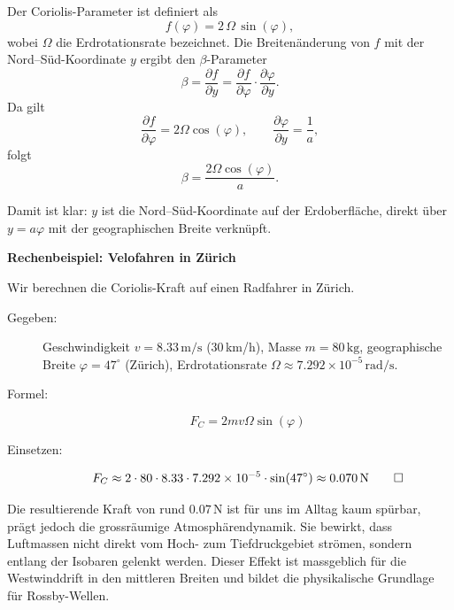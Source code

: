 Der Coriolis-Parameter ist definiert als
\begin{equation}
	f(\varphi) = 2 \, \Omega \, \sin(\varphi),
\end{equation}
wobei \(\Omega\) die Erdrotationsrate bezeichnet.
Die Breitenänderung von \(f\) mit der Nord–Süd-Koordinate \(y\) ergibt den \(\beta\)-Parameter
\begin{equation}
	\beta = \frac{\partial f}{\partial y}
	= \frac{\partial f}{\partial \varphi} \cdot \frac{\partial \varphi}{\partial y}.
\end{equation}
Da gilt
\begin{equation}
	\frac{\partial f}{\partial \varphi} = 2 \Omega \cos(\varphi),
	\qquad
	\frac{\partial \varphi}{\partial y} = \frac{1}{a},
\end{equation}
folgt
\begin{equation}
	\beta = \frac{2 \Omega \cos(\varphi)}{a}.
\end{equation}

Damit ist klar: \(y\) ist die Nord–Süd-Koordinate auf der Erdoberfläche, direkt
über \(y = a \varphi\) mit der geographischen Breite verknüpft.

\begin{beispiel}\textbf{Rechenbeispiel: Velofahren in Zürich}

\noindent
Wir berechnen die Coriolis-Kraft auf einen Radfahrer in Zürich.

\begin{description}
\item[Gegeben:] Geschwindigkeit \(v = 8.33\,\mathrm{m/s}\) (30\,km/h), Masse \(m =
      80\,\mathrm{kg}\), geographische Breite \(\varphi = 47^\circ\) (Zürich),
      Erdrotationsrate \(\Omega \approx 7.292 \times 10^{-5}\,\mathrm{rad/s}\).
\item[Formel:]
      \[
	      F_C = 2mv\Omega\sin(\varphi)
      \]
\item[Einsetzen:]
      \[
	      F_C \approx 2 \cdot 80 \cdot 8.33 \cdot 7.292 \times 10^{-5} \cdot \sin(47^\circ)
	      \approx 0.070\,\mathrm{N}
\qedhere
      \]
\end{description}

\end{beispiel}
\noindent
Die resultierende Kraft von rund \(0.07\,\mathrm{N}\) ist für uns im Alltag kaum spürbar, prägt jedoch die grossräumige Atmosphärendynamik.
Sie bewirkt, dass Luftmassen nicht direkt vom Hoch- zum Tiefdruckgebiet strömen, sondern entlang der Isobaren gelenkt werden.
Dieser Effekt ist massgeblich für die Westwinddrift in den mittleren Breiten und bildet die physikalische Grundlage für Rossby-Wellen.

